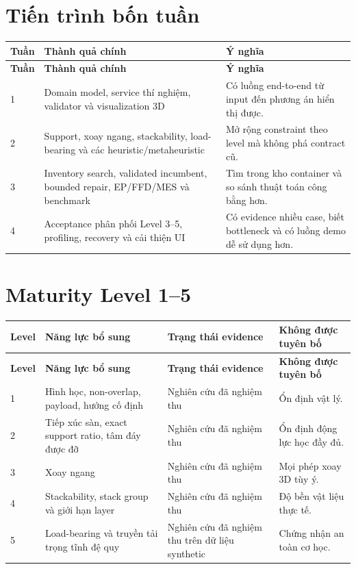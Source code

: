 \documentclass[12pt,a4paper]{article}
\newcommand{\code}[1]{\texttt{\detokenize{#1}}}
\begin{document}
\section{Tiến trình bốn tuần}

\begin{longtable}{p{}p{}p{}}
\toprule
\textbf{Tuần} & \textbf{Thành quả chính} & \textbf{Ý nghĩa} \\
\midrule
\endfirsthead
\toprule
\textbf{Tuần} & \textbf{Thành quả chính} & \textbf{Ý nghĩa} \\
\midrule
\endhead
1 & Domain model, service thí nghiệm, validator và visualization 3D
  & Có luồng end-to-end từ input đến phương án hiển thị được. \\
2 & Support, xoay ngang, stackability, load-bearing và các heuristic/metaheuristic
  & Mở rộng constraint theo level mà không phá contract cũ. \\
3 & Inventory search, validated incumbent, bounded repair, EP/FFD/MES và benchmark
  & Tìm trong kho container và so sánh thuật toán công bằng hơn. \\
4 & Acceptance phân phối Level 3--5, profiling, recovery và cải thiện UI
  & Có evidence nhiều case, biết bottleneck và có luồng demo dễ sử dụng hơn. \\
\bottomrule
\end{longtable}

\section{Maturity Level 1--5}

\begin{longtable}{p{}p{}p{}p{}}
\toprule
\textbf{Level} & \textbf{Năng lực bổ sung} & \textbf{Trạng thái evidence} &
\textbf{Không được tuyên bố} \\
\midrule
\endfirsthead
\toprule
\textbf{Level} & \textbf{Năng lực bổ sung} & \textbf{Trạng thái evidence} &
\textbf{Không được tuyên bố} \\
\midrule
\endhead
1 & Hình học, non-overlap, payload, hướng cố định
  & Nghiên cứu đã nghiệm thu & Ổn định vật lý. \\
2 & Tiếp xúc sàn, exact support ratio, tâm đáy được đỡ
  & Nghiên cứu đã nghiệm thu & Ổn định động lực học đầy đủ. \\
3 & Xoay ngang \code{XYZ/YXZ}
  & Nghiên cứu đã nghiệm thu & Mọi phép xoay 3D tùy ý. \\
4 & Stackability, stack group và giới hạn layer
  & Nghiên cứu đã nghiệm thu & Độ bền vật liệu thực tế. \\
5 & Load-bearing và truyền tải trọng tĩnh đệ quy
  & Nghiên cứu đã nghiệm thu trên dữ liệu synthetic & Chứng nhận an toàn cơ học. \\
\bottomrule
\end{longtable}
\end{document}
